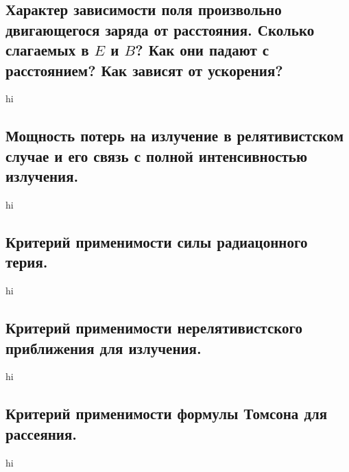 \documentclass[a4paper,12pt]{article}
\begin{document}
\subsection{Характер зависимости поля произвольно двигающегося заряда от
расстояния. Сколько слагаемых в $E$ и $B$? Как они падают с расстоянием?
Как зависят от ускорения?}
hi
\subsection{Мощность потерь на излучение в релятивистском случае и его связь
с полной интенсивностью излучения.}
hi
\subsection{Критерий применимости силы радиацонного терия.}
hi
\subsection{Критерий применимости нерелятивистского приближения для излучения.}
hi
\subsection{Критерий применимости формулы Томсона для рассеяния.}
hi
\end{document}

